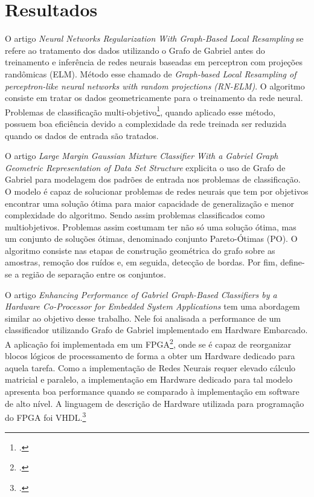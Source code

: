 \section{Resultados}

O artigo \emph{Neural Networks Regularization With Graph-Based Local Resampling}\cite{AlexAssis}
se refere ao tratamento dos dados utilizando o Grafo de Gabriel\cite{GabrielGraph1}
antes do treinamento e inferência de redes neurais baseadas em perceptron com projeções randômicas (ELM).
Método esse chamado de \emph{Graph-based Local Resampling of perceptron-like neural networks with random projections (RN-ELM)}.
O algoritmo consiste em tratar os dados geometricamente para o treinamento da rede neural. Problemas de classificação multi-objetivo\footcite{Problemas multiobjetivo: Problemas com mais de um objetivo},
quando aplicado esse método, possuem boa eficiência devido a complexidade da rede treinada ser reduzida quando os dados de entrada são tratados.

O artigo \emph{Large Margin Gaussian Mixture Classifier With a Gabriel Graph Geometric Representation of Data Set Structure}\cite{LuizBambirra}
explicita o uso de Grafo de Gabriel para modelagem dos padrões de entrada nos problemas de classificação. O modelo é capaz de solucionar problemas
de redes neurais que tem por objetivos encontrar uma solução ótima para maior capacidade de generalização e menor complexidade do algoritmo. Sendo assim problemas classificados como
multiobjetivos. Problemas assim costumam ter não só uma solução ótima, mas um conjunto de soluções ótimas, denominado conjunto Pareto-Ótimas (PO).
O algoritmo consiste nas etapas de construção geométrica do grafo sobre as amostras, remoção dos ruídos e, em seguida, detecção de bordas. Por fim, define-se
a região de separação entre os conjuntos. 


    O artigo \emph{Enhancing Performance of Gabriel Graph-Based Classifiers by a Hardware Co-Processor for Embedded System Applications}\cite{HardwareGabrielGraph}
tem uma abordagem similar ao objetivo desse trabalho. Nele foi analisada a performance de um classificador utilizando Grafo de Gabriel implementado em Hardware Embarcado.
A aplicação foi implementada em um FPGA\footcite{FPGA: Field-programmable gate array}, onde se é capaz de reorganizar blocos lógicos de processamento de forma a obter um Hardware dedicado 
para aquela tarefa. Como a implementação de Redes Neurais requer elevado cálculo matricial e paralelo, a implementação em Hardware dedicado para tal modelo apresenta boa performance quando se
comparado à implementação em software de alto nível. A linguagem de descrição de Hardware utilizada para programação do FPGA foi VHDL.\footcite{VHDL: VHSIC Hardware Description Language.}

